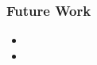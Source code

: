   \begin{frame}
    \frametitle{Future Work}
    \centering
    \begin{HUGE}
    \begin{itemize}
        \item {}
        \item {}
    \end{itemize}
    \end{HUGE}
  \end{frame}
